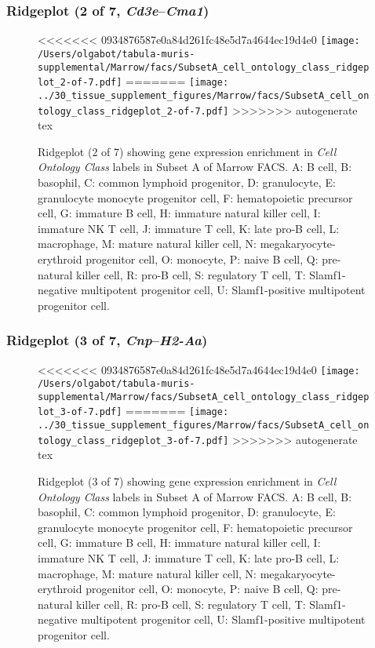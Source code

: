 \clearpage

\subsubsection{Ridgeplot (2 of 7, \emph{Cd3e}--\emph{Cma1})}
\begin{figure}[h]
\centering
<<<<<<< 0934876587e0a84d261fc48e5d7a4644ec19d4e0
\texttt{[image: /Users/olgabot/tabula-muris-supplemental/Marrow/facs/SubsetA\_cell\_ontology\_class\_ridgeplot\_2-of-7.pdf]}
=======
\texttt{[image: ../30\_tissue\_supplement\_figures/Marrow/facs/SubsetA\_cell\_ontology\_class\_ridgeplot\_2-of-7.pdf]}
>>>>>>> autogenerate tex

\caption{ Ridgeplot (2 of 7)  showing gene expression enrichment in \emph{Cell Ontology Class} labels in Subset A of Marrow FACS. A: B cell, B: basophil, C: common lymphoid progenitor, D: granulocyte, E: granulocyte monocyte progenitor cell, F: hematopoietic precursor cell, G: immature B cell, H: immature natural killer cell, I: immature NK T cell, J: immature T cell, K: late pro-B cell, L: macrophage, M: mature natural killer cell, N: megakaryocyte-erythroid progenitor cell, O: monocyte, P: naive B cell, Q: pre-natural killer cell, R: pro-B cell, S: regulatory T cell, T: Slamf1-negative multipotent progenitor cell, U: Slamf1-positive multipotent progenitor cell.}
\end{figure}


\clearpage

\subsubsection{Ridgeplot (3 of 7, \emph{Cnp}--\emph{H2-Aa})}
\begin{figure}[h]
\centering
<<<<<<< 0934876587e0a84d261fc48e5d7a4644ec19d4e0
\texttt{[image: /Users/olgabot/tabula-muris-supplemental/Marrow/facs/SubsetA\_cell\_ontology\_class\_ridgeplot\_3-of-7.pdf]}
=======
\texttt{[image: ../30\_tissue\_supplement\_figures/Marrow/facs/SubsetA\_cell\_ontology\_class\_ridgeplot\_3-of-7.pdf]}
>>>>>>> autogenerate tex

\caption{ Ridgeplot (3 of 7)  showing gene expression enrichment in \emph{Cell Ontology Class} labels in Subset A of Marrow FACS. A: B cell, B: basophil, C: common lymphoid progenitor, D: granulocyte, E: granulocyte monocyte progenitor cell, F: hematopoietic precursor cell, G: immature B cell, H: immature natural killer cell, I: immature NK T cell, J: immature T cell, K: late pro-B cell, L: macrophage, M: mature natural killer cell, N: megakaryocyte-erythroid progenitor cell, O: monocyte, P: naive B cell, Q: pre-natural killer cell, R: pro-B cell, S: regulatory T cell, T: Slamf1-negative multipotent progenitor cell, U: Slamf1-positive multipotent progenitor cell.}
\end{figure}


